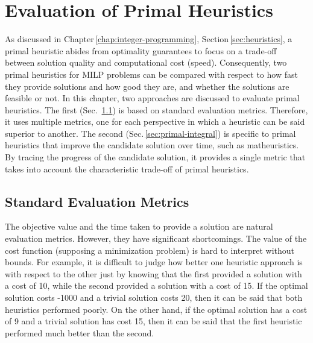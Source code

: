 

\chapter{Evaluation of Primal Heuristics}\label{chap:evaluation}

As discussed in Chapter\,\ref{chap:integer-programming}, Section\,\ref{sec:heuristics}, a primal heuristic abides from optimality guarantees to focus on a trade-off between solution quality and computational cost (speed).
Consequently, two primal heuristics for MILP problems can be compared with respect to how fast they provide solutions and how good they are, and whether the solutions are feasible or not.
In this chapter, two approaches are discussed to evaluate primal heuristics.
The first (Sec.~\ref{sec:standard-evaluation-metrics}) is based on standard evaluation metrics. Therefore, it uses multiple metrics, one for each perspective in which a heuristic can be said superior to another.
The second (Sec.\,\ref{sec:primal-integral}) is specific to primal heuristics that improve the candidate solution over time, such as matheuristics.
By tracing the progress of the candidate solution, it provides a single metric that takes into account the characteristic trade-off of primal heuristics.


\section{Standard Evaluation Metrics}\label{sec:standard-evaluation-metrics}

The objective value and the time taken to provide a solution are natural evaluation metrics.
However, they have significant shortcomings.
The value of the cost function (supposing a minimization problem) is hard to interpret without bounds.
For example, it is difficult to judge how better one heuristic approach is with respect to the other just by knowing that the first provided a solution with a cost of 10, while the second provided a solution with a cost of 15.
If the optimal solution costs -1000 and a trivial solution costs 20, then it can be said that both heuristics performed poorly.
On the other hand, if the optimal solution has a cost of 9 and a trivial solution has cost 15, then it can be said that the first heuristic performed much better than the second.

